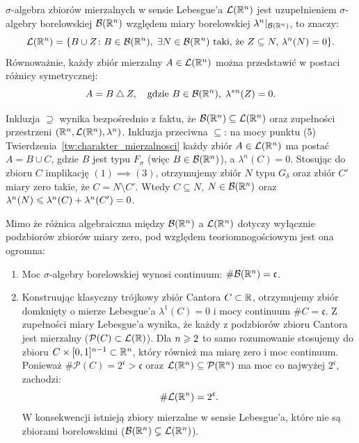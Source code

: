 \begin{tw}
    $\sigma$-algebra zbiorów mierzalnych w sensie Lebesgue'a $\mathcal{L}({\mathbb{R}^{n}})$ jest uzupełnieniem $\sigma$-algebry borelowskiej $\mathcal{B}({\mathbb{R}^{n}})$ względem miary borelowskiej $\lambda^n|_{\mathcal{B}({\mathbb{R}^{n}})}$, to znaczy:
    \begin{equation*}
        \mathcal{L}({\mathbb{R}^{n}}) = \{B \cup Z \colon B \in \mathcal{B}({\mathbb{R}^{n}}), \; \exists N \in \mathcal{B}({\mathbb{R}^{n}}) \text{ taki, że } Z \subseteq N, \, \lambda^n(N) = 0\}.
    \end{equation*}
    Równoważnie, każdy zbiór mierzalny $A \in \mathcal{L}({\mathbb{R}^{n}})$ można przedstawić w postaci różnicy symetrycznej:
    \begin{equation*}
        A = B \mathbin{\triangle} Z, \quad \text{gdzie } B \in \mathcal{B}({\mathbb{R}^{n}}), \; \lambda^{*n}(Z) = 0.
    \end{equation*}
\end{tw}

\begin{dow}
    Inkluzja $\supseteq $ wynika bezpośrednio z faktu, że $\mathcal{B}({\mathbb{R}^{n}}) \subseteq \mathcal{L}({\mathbb{R}^{n}})$ oraz zupełności przestrzeni $(\mathbb{R}^{n}, \mathcal{L}({\mathbb{R}^{n}}), \lambda^n)$.
    Inkluzja przeciwna $\subseteq$: na mocy punktu (5) Twierdzenia~\ref{tw:charakter_mierzalnosci} każdy zbiór $A \in \mathcal{L}({\mathbb{R}^{n}})$ ma postać $A = B \cup C$, gdzie $B$ jest typu $F_\sigma$ (więc $B \in \mathcal{B}({\mathbb{R}^{n}})$), a $\lambda^n(C) = 0$. Stosując do zbioru $C$ implikację $(1) \implies (3)$, otrzymujemy zbiór $N$ typu $G_\delta$ oraz zbiór $C'$ miary zero takie, że $C = N \setminus C'$. Wtedy $C \subseteq N$, $N \in \mathcal{B}({\mathbb{R}^{n}})$ oraz $\lambda^n(N) \leqslant \lambda^n(C) + \lambda^n(C') = 0$.
\end{dow}

\begin{uwaga}
    Mimo że różnica algebraiczna między $\mathcal{B}({\mathbb{R}^{n}})$ a $\mathcal{L}({\mathbb{R}^{n}})$ dotyczy wyłącznie podzbiorów zbiorów miary zero, pod względem teoriomnogościowym jest ona ogromna:
    \begin{enumerate}
        \item Moc $\sigma$-algebry borelowskiej wynosi continuum: $\#\mathcal{B}({\mathbb{R}^{n}}) = \mathfrak{c}$.
        \item Konstruując klasyczny trójkowy zbiór Cantora $C \subset \mathbb{R}$, otrzymujemy zbiór domknięty o mierze Lebesgue'a $\lambda^1(C) = 0$ i mocy continuum $\#C = \mathfrak{c}$. Z zupełności miary Lebesgue'a wynika, że każdy z podzbiorów zbioru Cantora jest mierzalny ($\mathcal{P}(C) \subset \mathcal{L}({\mathbb{R}})$). Dla $n \geqslant 2$ to samo rozumowanie stosujemy do zbioru $C \times [0, 1]^{n-1} \subset \mathbb{R}^{n}$, który również ma miarę zero i moc continuum. Ponieważ $\#\mathcal{P}(C) = 2^\mathfrak{c} > \mathfrak{c}$ oraz $\mathcal{L}({\mathbb{R}^{n}}) \subseteq \mathcal{P}(\mathbb{R}^{n})$ ma moc co najwyżej $2^\mathfrak{c}$, zachodzi:
              \begin{equation*}
                  \#\mathcal{L}({\mathbb{R}^{n}}) = 2^\mathfrak{c}.
              \end{equation*}
              W konsekwencji istnieją zbiory mierzalne w sensie Lebesgue'a, które nie są zbiorami borelowskimi ($\mathcal{B}({\mathbb{R}^{n}}) \subsetneq \mathcal{L}({\mathbb{R}^{n}})$).
    \end{enumerate}
\end{uwaga}


